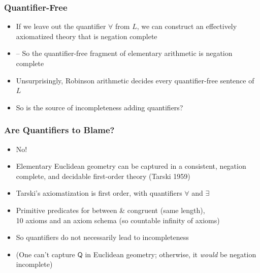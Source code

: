 \begin{frame}
\frametitle{Quantifier-Free}

\begin{itemize}[<+->]

\item If we leave out the quantifier $\forall$ from $L$, we can construct an effectively axiomatized theory that is negation complete

\item[] -- So the quantifier-free fragment of elementary arithmetic is negation complete

\item Unsurprisingly, Robinson arithmetic decides every quantifier-free sentence of $L$

\item So is the source of incompleteness adding quantifiers?

\end{itemize}
\end{frame}

\begin{frame}
\frametitle{Are Quantifiers to Blame?}

\begin{itemize}[<+->]

\item No!

\item Elementary Euclidean geometry can be captured in a consistent, negation complete, and decidable first-order theory (Tarski 1959)

\item Tarski's axiomatization is first order, with quantifiers $\forall$ and $\exists$

\item Primitive predicates for between \& congruent (same length), \\ 10 axioms and an axiom schema (so countable infinity of axioms)

\item So quantifiers do not necessarily lead to incompleteness

\item (One can't capture $\mathsf{Q}$ in Euclidean geometry; otherwise, it \textit{would} be negation incomplete)


\end{itemize}
\end{frame}


